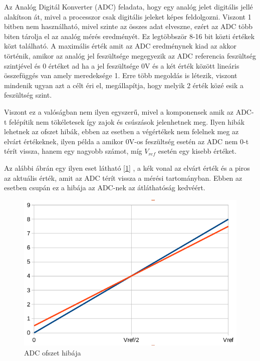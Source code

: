 Az Analóg Digitál Konverter (ADC) feladata, hogy egy analóg jelet digitális jellé
alakítson át, mivel a processzor csak digitális jeleket képes feldolgozni. Viszont 
1 bitben nem használható, mivel szinte az összes adat elveszne, ezért az ADC több 
biten tárolja el az analóg mérés eredményét. Ez legtöbbször 8-16 bit közti értékek 
közt található. A maximális érték amit az ADC eredménynek kiad az akkor történik, 
amikor az analóg jel feszültsége megegyezik az ADC referencia feszültség szintjével 
és 0 értéket ad ha a jel feszültsége 0V és a két érték között lineáris összefüggés 
van amely meredeksége 1. Erre több megoldás is létezik, viszont mindenik ugyan azt a célt éri el, 
megállapítja, hogy melyik 2 érték közé esik a feszültség szint.

Viszont ez a valóságban nem ilyen egyszerű, mivel a komponensek amik az ADC-t 
felépítik nem tökéletesek így zajok és csúszások jelenhetnek meg. Ilyen hibák 
lehetnek az ofszet hibák, ebben az esetben a végértékek nem felelnek meg az elvárt 
értékeknek, ilyen példa a amikor 0V-os feszültség esetén az ADC nem 0-t térít 
vissza, hanem egy nagyobb számot, míg $V_{ref}$ esetén egy kisebb értéket.

Az alábbi ábrán egy ilyen eset látható [\ref{fig:ADC_Offset_Error}] , a kék vonal az elvárt érték és a piros 
az aktuális érték, amit az ADC térít vissza a mérési tartományban. Ebben az 
esetben csupán ez a hibája az ADC-nek az átláthatóság kedvéért. 


\begin{figure}[h]
    \centering
    \includegraphics[scale=0.3]{figures/images/literature/ADC_Offset_Error.png}
    \caption{ADC ofszet hibája}
    \label{fig:ADC_Offset_Error}
\end{figure}

